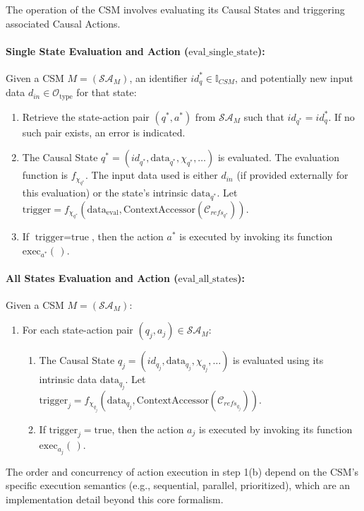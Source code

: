 The operation of the CSM involves evaluating its Causal States and triggering associated Causal Actions.

\paragraph{Single State Evaluation and Action (\(\text{eval\_single\_state}\)):}
Given a CSM \(M = (\mathcal{SA}_M)\), an identifier \(id_q^* \in \mathbb{I}_{CSM}\), and potentially new input data \(d_{in} \in \mathcal{O}_{\text{type}}\) for that state:
\begin{enumerate}
    \item Retrieve the state-action pair \((q^*, a^*)\) from \(\mathcal{SA}_M\) such that \(id_{q^*} = id_q^*\). If no such pair exists, an error is indicated.
    \item The Causal State \(q^* = (id_{q^*}, \text{data}_{q^*}, \chi_{q^*}, \dots)\) is evaluated. The evaluation function is \(f_{\chi_{q^*}}\). The input data used is either \(d_{in}\) (if provided externally for this evaluation) or the state's intrinsic \(\text{data}_{q^*}\).
    Let \( \text{trigger} = f_{\chi_{q^*}}(\text{data}_{\text{eval}}, \text{ContextAccessor}(\mathcal{C}_{refs_{q^*}})) \).
    \item If \(\text{trigger} = \text{true}\), then the action \(a^*\) is executed by invoking its function \(\text{exec}_{a^*}(\,)\).
\end{enumerate}

\paragraph{All States Evaluation and Action (\(\text{eval\_all\_states}\)):}
Given a CSM \(M = (\mathcal{SA}_M)\):
\begin{enumerate}
    \item For each state-action pair \((q_j, a_j) \in \mathcal{SA}_M\):
    \begin{enumerate}
        \item The Causal State \(q_j = (id_{q_j}, \text{data}_{q_j}, \chi_{q_j}, \dots)\) is evaluated using its intrinsic data \(\text{data}_{q_j}\).
        Let \( \text{trigger}_j = f_{\chi_{q_j}}(\text{data}_{q_j}, \text{ContextAccessor}(\mathcal{C}_{refs_{q_j}})) \).
        \item If \(\text{trigger}_j = \text{true}\), then the action \(a_j\) is executed by invoking its function \(\text{exec}_{a_j}(\,)\).
    \end{enumerate}
\end{enumerate}
The order and concurrency of action execution in step 1(b) depend on the CSM's specific execution semantics (e.g., sequential, parallel, prioritized), which are an implementation detail beyond this core formalism.

